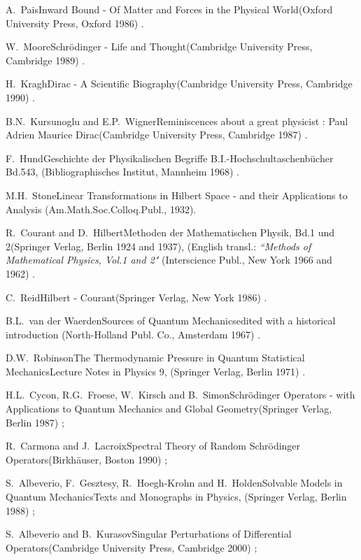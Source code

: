 \documentclass[a4wide,12pt]{report}
\begin{document}
\begin{thebibliography}{22}
 
\bookref
{A.~Pais}{Inward Bound - Of Matter and Forces in the Physical
World}{(Oxford University Press, Oxford 1986) .}

 
\bookref
{W.~Moore}{Schr\"odinger - Life and Thought}{(Cambridge 
University Press, Cambridge 1989) .}

 
\bookref
{H.~Kragh}{Dirac - A Scientific Biography}{(Cambridge 
University Press, Cambridge 1990) .}


\bookref
{B.N.~Kursunoglu and E.P.~Wigner}{Reminiscences about a great 
physicist : Paul Adrien Maurice Dirac}{(Cambridge 
University Press, Cambridge 1987) .}
 

\bookref
{F.~Hund}{Geschichte der Physikalischen Begriffe}{
B.I.-Hochschultaschen\-b\"ucher Bd.543, (Bibliographisches
Institut, Mannheim 1968) .}


\bookref
{M.H.~Stone}{Linear Transformations in Hilbert Space
- and their Applications to Analysis}{
(Am.Math.Soc.Colloq.Publ., 1932).} 


\bookref
{R.~Courant and D.~Hilbert}{Methoden der Mathematischen Physik,
Bd.1 und 2}{(Springer Verlag, Berlin 1924 and 1937), (English
transl.: {\it ``Methods of Mathematical Physics, Vol.1 and 2"}
(Interscience Publ., New York 1966 and 1962) .}

 
\bookref
{C.~Reid}{Hilbert - Courant}{(Springer Verlag, New York 1986) .}


\bookref
{B.L.~van der Waerden}{Sources of Quantum Mechanics}{edited with
a historical introduction (North-Holland Publ. Co., Amsterdam 1967) .}

 
\bookref
{D.W.~Robinson}{The Thermodynamic Pressure in Quantum Statistical
Mechanics}{Lecture Notes in Physics 9,
(Springer Verlag, Berlin 1971) .}

 
\bookref
{H.L.~Cycon, R.G.~Froese, W.~Kirsch and B.~Simon}{Schr\"odinger
Ope\-rators - with Applications to Quantum Mechanics and Global
Geometry}{(Springer Verlag, Berlin 1987) ;}
 
\bookref
{R.~Carmona and J.~Lacroix}{Spectral Theory of Random Schr\"odinger
Operators}{(Birkh\"auser, Boston 1990) ;}
 
\bookref
{S.~Albeverio, F.~Gesztesy, R.~Hoegh-Krohn and H.~Holden}{Sol\-vable
Models in Quantum Mechanics}{Texts and Monographs in Physics,
(Springer Verlag, Berlin 1988) ;}

\bookref
{S.~Albeverio  and B.~Kurasov}{Singular Perturbations of 
Differential 
Operators}{(Cambridge University Press, Cambridge 2000) ;}


\end{thebibliography}
\end{document}
